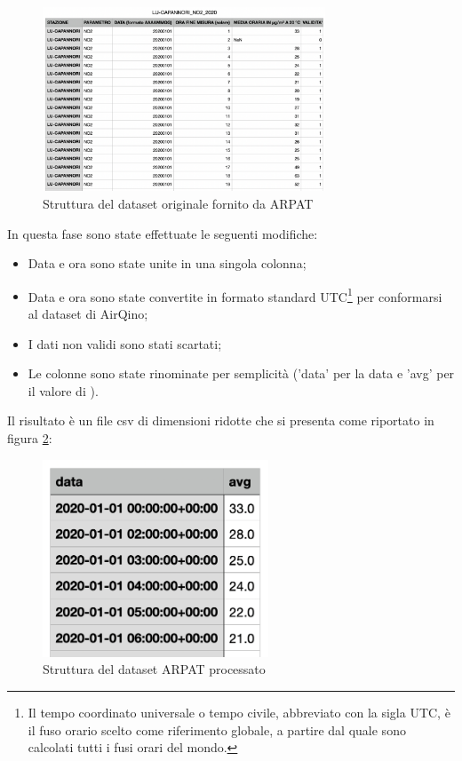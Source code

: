 \begin{figure}[H]
\centering
\captionsetup{justification=centering}
\includegraphics[width=0.75\textwidth,height=\textheight,keepaspectratio]{img/dataset_arpat_no2_prima.png}
\caption{Struttura del dataset originale  fornito da ARPAT}
\label{fig:ds-arpat}
\end{figure}

In questa fase sono state effettuate le seguenti modifiche:
\begin{itemize}
  \item Data e ora sono state unite in una singola colonna;
  \item Data e ora sono state convertite in formato standard UTC\footnote{Il tempo coordinato universale o tempo civile, abbreviato con la sigla UTC, è il fuso orario scelto come riferimento globale, a partire dal quale sono calcolati tutti i fusi orari del mondo.} per conformarsi al dataset di AirQino;
  \item I dati non validi sono stati scartati;
  \item Le colonne sono state rinominate per semplicità ('data' per la data e 'avg' per il valore di ).
\end{itemize}

Il risultato è un file csv di dimensioni ridotte che si presenta come riportato in figura \ref{fig:ds-arpat-dopo}:

\begin{figure}[H]
\centering
\captionsetup{justification=centering}
\includegraphics[width=0.60\textwidth,height=\textheight,keepaspectratio]{img/dataset_arpat_no2_dopo.png}
\caption{Struttura del dataset ARPAT  processato}
\label{fig:ds-arpat-dopo}
\end{figure}

